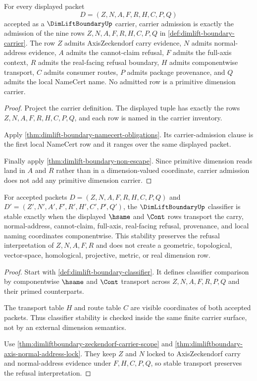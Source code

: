 \begin{theorem}
\label{thm:dimliftboundary-obligation-carrier}
For every displayed packet
$$
D=(Z,N,A,F,R,H,C,P,Q)
$$
accepted as a $\DimLiftBoundaryUp$ carrier, carrier admission is exactly the admission of the nine rows $Z,N,A,F,R,H,C,P,Q$ in \autoref{def:dimlift-boundary-carrier}. The row $Z$ admits AxisZeckendorf carry evidence, $N$ admits normal-address evidence, $A$ admits the cannot-claim refusal, $F$ admits the full-axis context, $R$ admits the real-facing refusal boundary, $H$ admits componentwise transport, $C$ admits consumer routes, $P$ admits package provenance, and $Q$ admits the local NameCert name. No admitted row is a primitive dimension carrier.
\end{theorem}
\begin{proof}
Project the carrier definition. The displayed tuple has exactly the rows $Z,N,A,F,R,H,C,P,Q$, and each row is named in the carrier inventory.

Apply \autoref{thm:dimlift-boundary-namecert-obligations}. Its carrier-admission clause is the first local NameCert row and it ranges over the same displayed packet.

Finally apply \autoref{thm:dimlift-boundary-non-escape}. Since primitive dimension reads land in $A$ and $R$ rather than in a dimension-valued coordinate, carrier admission does not add any primitive dimension carrier.
\end{proof}

\begin{theorem}
\label{thm:dimliftboundary-obligation-classifier}
For accepted packets $D=(Z,N,A,F,R,H,C,P,Q)$ and $D'=(Z',N',A',F',R',H',C',P',Q')$, the $\DimLiftBoundaryUp$ classifier is stable exactly when the displayed $\hsame$ and $\Cont$ rows transport the carry, normal-address, cannot-claim, full-axis, real-facing refusal, provenance, and local naming coordinates componentwise. This stability preserves the refusal interpretation of $Z,N,A,F,R$ and does not create a geometric, topological, vector-space, homological, projective, metric, or real dimension row.
\end{theorem}
\begin{proof}
Start with \autoref{def:dimlift-boundary-classifier}. It defines classifier comparison by componentwise $\hsame$ and $\Cont$ transport across $Z,N,A,F,R,P,Q$ and their primed counterparts.

The transport table $H$ and route table $C$ are visible coordinates of both accepted packets. Thus classifier stability is checked inside the same finite carrier surface, not by an external dimension semantics.

Use \autoref{thm:dimliftboundary-zeckendorf-carrier-scope} and \autoref{thm:dimliftboundary-axis-normal-address-lock}. They keep $Z$ and $N$ locked to AxisZeckendorf carry and normal-address evidence under $F,H,C,P,Q$, so stable transport preserves the refusal interpretation.
\end{proof}

